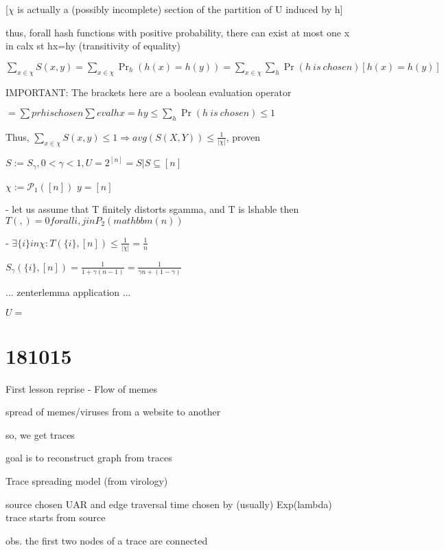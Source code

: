 \documentclass{report}
\begin{document}
	[$\chi$ is actually a (possibly incomplete) section of the partition of U induced by h]
	
	thus, forall hash functions with positive probability, there can exist at most one x in calx st hx=hy (transitivity of equality)
	
	$\sum_{x \in \chi}S(x, y) = \sum_{x \in \chi}\Pr_h(h(x)=h(y)) = \sum_{x \in \chi}\sum_{h}\Pr(h\ is\ chosen)[h(x)=h(y)]$
	
	IMPORTANT: The brackets here are a boolean evaluation operator
	
	$= \sum pr h is chosen \sum eval hx = hy \leq \sum_h \Pr(h\ is\ chosen) \leq 1$
	
	Thus, $\sum_{x \in \chi}S(x, y) \leq 1 \Rightarrow avg(S(X, Y)) \leq \frac{1}{|\chi|}$, proven
	
	
	
	
	$S:= S_\gamma , 0 < \gamma < 1, U=2^{[n]}={S|S\subseteq [n]}$ %
	
	$\chi := \mathcal{P}_1([n])$
	$y = [n]$
	
	 - let us assume that T finitely distorts sgamma, and T is lshable
	then $T({},{}) = 0 forall {i, j} in P_2(mathbbm(n))$
	
	 - $\exists \{i\} in \chi : T(\{i\}, [n]) \leq \frac{1}{|\chi|} = \frac{1}{n}$
	 
	 $S_\gamma(\{i\}, [n]) = \frac{1}{1 + \gamma(n-1)} = \frac{1}{\gamma n + (1-\gamma)}$
	 
	 ...
	 zenterlemma application
	 ...
	
	
	
	$ U = {}$
	
	
	\chapter{181015}
	
	First lesson reprise - Flow of memes
	
	spread of memes/viruses from a website to another
	
	so, we get traces
	
	goal is to reconstruct graph from traces
	
	Trace spreading model (from virology)
	
	source chosen UAR and edge traversal time chosen by (usually) Exp(lambda)
	trace starts from source
	
	obs. the first two nodes of a trace are connected
	
\end{document}
